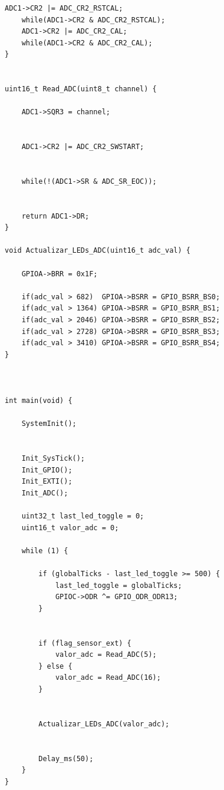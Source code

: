 \begin{lstlisting}[caption={Configuración inicial en main.c}, label={cod:main}]
    ADC1->CR2 |= ADC_CR2_RSTCAL;
    while(ADC1->CR2 & ADC_CR2_RSTCAL);
    ADC1->CR2 |= ADC_CR2_CAL;
    while(ADC1->CR2 & ADC_CR2_CAL);
}


uint16_t Read_ADC(uint8_t channel) {

    ADC1->SQR3 = channel;
    

    ADC1->CR2 |= ADC_CR2_SWSTART;
    

    while(!(ADC1->SR & ADC_SR_EOC));
    

    return ADC1->DR;
}

void Actualizar_LEDs_ADC(uint16_t adc_val) {

    GPIOA->BRR = 0x1F; 
    
    if(adc_val > 682)  GPIOA->BSRR = GPIO_BSRR_BS0;
    if(adc_val > 1364) GPIOA->BSRR = GPIO_BSRR_BS1;
    if(adc_val > 2046) GPIOA->BSRR = GPIO_BSRR_BS2;
    if(adc_val > 2728) GPIOA->BSRR = GPIO_BSRR_BS3;
    if(adc_val > 3410) GPIOA->BSRR = GPIO_BSRR_BS4;
}



int main(void) {

    SystemInit();
    

    Init_SysTick();
    Init_GPIO();
    Init_EXTI();
    Init_ADC();

    uint32_t last_led_toggle = 0;
    uint16_t valor_adc = 0;

    while (1) {

        if (globalTicks - last_led_toggle >= 500) {
            last_led_toggle = globalTicks;
            GPIOC->ODR ^= GPIO_ODR_ODR13;
        }


        if (flag_sensor_ext) {
            valor_adc = Read_ADC(5); 
        } else {
            valor_adc = Read_ADC(16);
        }


        Actualizar_LEDs_ADC(valor_adc);
        

        Delay_ms(50); 
    }
}
\end{lstlisting}
